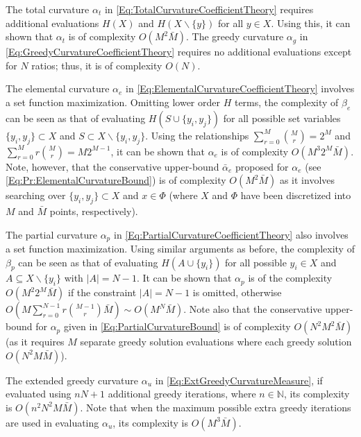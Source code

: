 \documentclass[letterpaper, 10 pt, conference]{ieeeconf}
\newcommand{\N}{\mathbb{N}}
\begin{document}
The total curvature $\alpha_t$ in \eqref{Eq:TotalCurvatureCoefficientTheory} requires additional evaluations $H(X)$ and $H(X\backslash \{y\})$ for all $y\in X$. Using this, it can shown that $\alpha_t$ is of complexity $O(M^2\bar{M})$. The greedy curvature  $\alpha_g$ in \eqref{Eq:GreedyCurvatureCoefficientTheory} requires no additional evaluations except for $N$ ratios; thus, it is of complexity $O(N)$. 

The elemental curvature $\alpha_e$ in \eqref{Eq:ElementalCurvatureCoefficientTheory} involves a set function maximization. Omitting lower order $H$ terms, the complexity of $\beta_e$ can be seen as that of evaluating $H(S\cup\{y_i,y_j\})$ for all possible set variables $\{y_i,y_j\}\subset X$ and $S\subset X\backslash \{y_i,y_j\}$. Using the relationships $\sum_{r=0}^M {M \choose r} = 2^M$ and $\sum_{r=0}^M r {M \choose r} = M2^{M-1}$, it can be shown that $\alpha_e$ is of complexity $O(M^3 2^M \bar{M})$. Note, however, that the conservative upper-bound $\bar{\alpha}_e$ proposed for $\alpha_e$ (see \eqref{Eq:Pr:ElementalCurvatureBound}) is of complexity $O(M^2\bar{M})$ as it involves searching over $\{y_i,y_j\}\subset X$ and $x\in\Phi$ (where $X$ and $\Phi$ have been discretized into $M$ and $\bar{M}$ points, respectively).

The partial curvature $\alpha_p$ in \eqref{Eq:PartialCurvatureCoefficientTheory} also involves a set function maximization. Using similar arguments as before, the complexity of $\beta_p$ can be seen as that of evaluating $H(A\cup \{y_i\})$ for all possible $y_i\in X$ and $A \subseteq X\backslash \{y_i\}$ with $\vert A \vert = N-1$. It can be shown that $\alpha_p$ is of the complexity $O(M^2 2^M \bar{M})$ if the constraint  $\vert A \vert = N-1$ is omitted, otherwise $O(M \sum_{r=0}^{N-1} r{M-1 \choose r}  \bar{M}) \sim O(M^N \bar{M})$. Note also that the conservative upper-bound for $\alpha_p$ given in \eqref{Eq:PartialCurvatureBound} is of complexity $O(N^2 M^2 \bar{M})$ (as it requires $M$ separate greedy solution evaluations where each greedy solution $O(N^2 M \bar{M})$).
      
The extended greedy curvature $\alpha_u$ in \eqref{Eq:ExtGreedyCurvatureMeasure}, if evaluated using $nN+1$ additional greedy iterations, where $n\in \N$, its complexity is $O(n^2N^2M\bar{M})$. Note that when the maximum possible extra greedy iterations are used in evaluating $\alpha_u$, its complexity is $O(M^3\bar{M})$.
\end{document}
